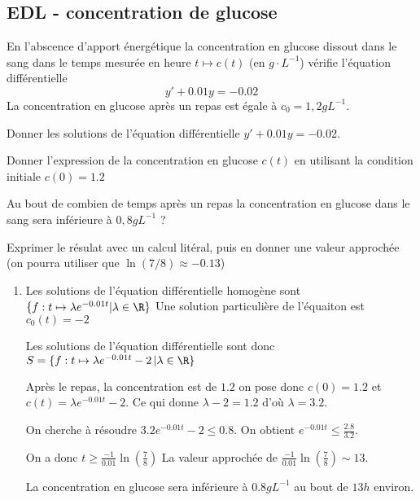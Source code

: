 \subsection{EDL - concentration de glucose}
\begin{exercice}
En l'abscence d'apport énergétique la concentration en glucose dissout dans le sang dans le temps mesurée en heure  $t\mapsto c(t)$   (en $g\cdot L^{-1}$) vérifie l'équation différentielle $$y'+0.01y= -0.02$$
La concentration en glucose après un repas est égale à $c_0=1,2gL^{-1}$.

Donner les solutions de l'équation différentielle $y'+0.01y= -0.02$.

Donner l'expression de la concentration en glucose $c(t)$ en utilisant la condition initiale $c(0) =1.2$

Au bout de combien de temps après un repas la concentration en glucose dans le sang sera inférieure à $0,8gL^{-1}$ ? 

Exprimer le résulat avec un calcul litéral, puis en donner une valeur approchée (on pourra utiliser que $\ln(7/8)  \approx -0.13$)

\end{exercice}

\begin{correction}
\begin{enumerate}
\item Les solutions de l'équation différentielle homogène sont $\{ f : t\mapsto \lambda e^{-0.01t} |\lambda\in \R\}$
Une solution particulière de l'équaiton est $c_0(t) = -2$ 

Les solutions de l'équation différentielle sont donc $S=\{ f : t\mapsto \lambda e^{-0.01t} - 2\, | \lambda\in \R\}$

Après le repas, la concentration est de $1.2$ on pose donc $c(0)=1.2$ et $c(t) =  \lambda e^{-0.01t} - 2$. Ce qui donne $\lambda -2 = 1.2 $ d'où $\lambda=3.2$. 


On cherche à résoudre $3.2e^{-0.01t} -2 \leq 0.8$. On obtient 
$e^{-0.01t} \leq \frac{2.8}{3.2}$.

On a donc $t\geq \frac{-1}{0.01}\ln(\frac{7}{8})$
La valeur approchée de $\frac{-1}{0.01}\ln(\frac{7}{8})\sim 13$. 

La concentration en glucose sera inférieure à $0.8gL^{-1}$ au bout de $13h$ environ. 



\end{enumerate}
\end{correction}